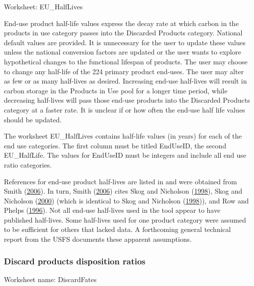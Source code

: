 \documentclass[
  openany]{book}
\begin{document}
Worksheet: EU\_HalfLives

End-use product half-life values express the decay rate at which carbon
in the products in use category passes into the Discarded Products
category. National default values are provided. It is unnecessary for
the user to update these values unless the national conversion factors
are updated or the user wants to explore hypothetical changes to the
functional lifespan of products. The user may choose to change any
half-life of the 224 primary product end-uses. The user may alter as few
or as many half-lives as desired. Increasing end-use half-lives will
result in carbon storage in the Products in Use pool for a longer time
period, while decreasing half-lives will pass those end-use products
into the Discarded Products category at a faster rate. It is unclear if
or how often the end-use half life values should be updated.

The worksheet EU\_HalfLives contains half-life values (in years) for
each of the end use categories. The first column must be titled
EndUseID, the second EU\_HalfLife. The values for EndUseID must be
integers and include all end use ratio categories.

References for end-use product half-lives are listed in and were
obtained from Smith (\protect\hyperlink{ref-smith2006}{2006}). In turn,
Smith (\protect\hyperlink{ref-smith2006}{2006}) cites Skog and Nicholson
(\protect\hyperlink{ref-skog1998}{1998}), Skog and Nicholson
(\protect\hyperlink{ref-skog2000}{2000}) (which is identical to Skog and
Nicholson (\protect\hyperlink{ref-skog1998}{1998})), and Row and Phelps
(\protect\hyperlink{ref-row1996}{1996}). Not all end-use half-lives used
in the tool appear to have published half-lives. Some half-lives used
for one product category were assumed to be sufficient for others that
lacked data. A forthcoming general technical report from the USFS
documents these apparent assumptions.

\hypertarget{own-prov-input-discFates}{%
\subsubsection{Discard products disposition
ratios}\label{own-prov-input-discFates}}

Worksheet name: DiscardFates
\end{document}
